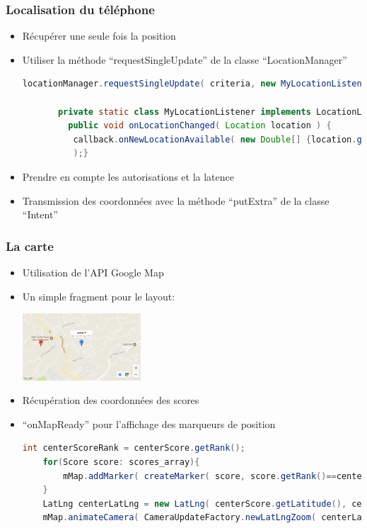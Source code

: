 \documentclass[handout]{beamer}
\begin{document}
\begin{frame}[fragile]
  \frametitle<1->{Localisation du téléphone}
    \begin{itemize} %
    \item <1->{Récupérer une seule fois la position} %
    \item <2->{Utiliser la méthode \enquote{requestSingleUpdate} de la classe \enquote{LocationManager}}
    \begin{lstlisting}[language=java]
       locationManager.requestSingleUpdate( criteria, new MyLocationListener( callback ), null );

       private static class MyLocationListener implements LocationListener { ...
         public void onLocationChanged( Location location ) {
          callback.onNewLocationAvailable( new Double[] {location.getLatitude(), location.getLongitude()} 
          );}
    \end{lstlisting}
    \item <3->{Prendre en compte les autorisations et la latence} %
    \item <3->{Transmission des coordonnées avec la méthode \enquote{putExtra} de la classe \enquote{Intent}} %
    \end{itemize}
\end{frame}

\begin{frame}[fragile]
  \frametitle<1->{La carte} %
    \begin{itemize}
    \item <1->{Utilisation de l'API Google Map}%
    \item <2->{Un simple fragment pour le layout:}
    \begin{center}
      \includegraphics[height=25mm]{map_marker.png}
    \end{center}
    \item <3->{Récupération des coordonnées des scores}
    \item <4->{\enquote{onMapReady} pour l'affichage des marqueurs de position}
    \begin{lstlisting}[language=java]
    int centerScoreRank = centerScore.getRank();
    for(Score score: scores_array){
        mMap.addMarker( createMarker( score, score.getRank()==centerScoreRank ) );
    }
    LatLng centerLatLng = new LatLng( centerScore.getLatitude(), centerScore.getLongitude() );
    mMap.animateCamera( CameraUpdateFactory.newLatLngZoom( centerLatLng, 11 ) );
    \end{lstlisting} %
    \end{itemize}
\end{frame}
\end{document}

